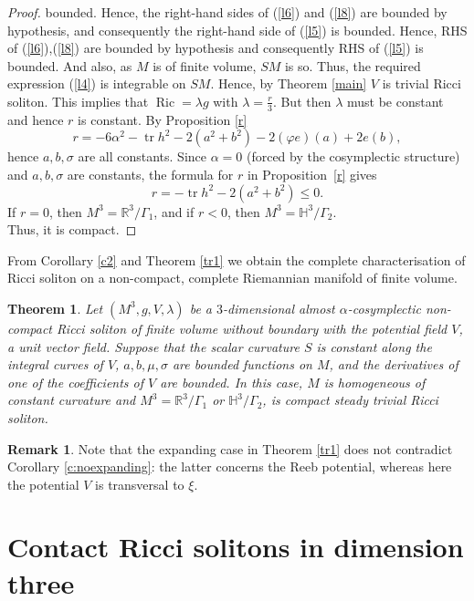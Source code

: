 \documentclass[a4paper, twoside, 10pt]{article}
\numberwithin{equation}{section}
\newtheorem{theorem}{Theorem}[section]
\theoremstyle{definition}
\newtheorem{remark}{Remark}[section]
\begin{document}
\begin{proof}
bounded. Hence, the right-hand sides of (\ref{l6}) and (\ref{l8}) are
bounded by hypothesis, and consequently the right-hand side of (\ref{l5}) is bounded. Hence, RHS of (\ref{l6}),(\ref{l8}) are bounded by hypothesis and
consequently RHS of (\ref{l5}) is bounded.
And also, as $M$ is of finite volume, $SM$ is so.
Thus, the required expression (\ref{l4}) is integrable 
on $SM$. Hence, by Theorem \ref{main} $V$ is trivial 
Ricci soliton. This implies that 
$\operatorname{Ric}=\lambda g$ with $\lambda = \frac{r}{3}$.
But then $\lambda$ must be constant and hence $r$
is constant. By Proposition \ref{r} 
$$r=-6 \alpha^{2}-\operatorname{tr} h^{2}-2\left(a^{2}+b^{2}\right)-2(\varphi e)(a)+2 e(b),$$
hence $a, b, \sigma$ are all constants. Since $\alpha=0$ (forced by the cosymplectic structure) and
$a,b,\sigma$ are constants, the formula for $r$ in
Proposition~\ref{r} gives
\[
r=-\operatorname{tr}h^2-2(a^2+b^2)\le0.
\] If $r = 0$, then $M^3 = {\mathbb R^3}/{\Gamma_{1}}$,
and if $r < 0$, then $M^3 = {\mathbb H^3}/{\Gamma_{2}}$.\\
Thus, it is compact.
\end{proof}

From Corollary \ref{c2} and Theorem \ref{tr1} we obtain the complete characterisation of 
Ricci soliton on a non-compact, complete Riemannian manifold of finite volume.    

\begin{theorem}\label{tr2}
Let  $\left(M^3, g, V, \lambda \right)$ be a $3$-dimensional almost $\alpha$-cosymplectic non-compact Ricci soliton of finite volume without boundary with the potential field $V$, a unit vector field. Suppose that the scalar curvature $S$
is constant along the integral curves of $V$,
$a, b, \mu, \sigma$  are  bounded functions on $M$, and the derivatives of one of the coefficients of $V$ are bounded. In this case, $M$ is homogeneous of constant curvature  and $M^3 = {\mathbb R}^3/{\Gamma}_1$ or ${\mathbb H}^3/{\Gamma}_2$,  is compact steady trivial Ricci soliton.  
\end{theorem}

\begin{remark}
    Note that the expanding case in Theorem \ref{tr1} does not contradict
Corollary \ref{c:noexpanding}: the latter concerns the Reeb potential,
whereas here the potential $V$ is transversal to $\xi$.
\end{remark}
\section{Contact Ricci solitons in dimension three}
\end{document}
